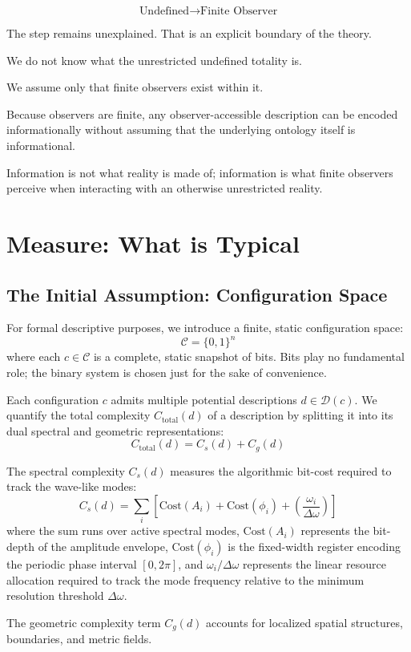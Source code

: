 \[
\text{Undefined} \rightarrow  \text{Finite Observer} 
\]

The step remains unexplained. That is an explicit boundary of the theory.

We do not know what the unrestricted undefined totality is.

We assume only that finite observers exist within it.

Because observers are finite, any observer-accessible description can be encoded informationally without assuming that the underlying ontology itself is informational.

Information is not what reality is made of; information is what finite observers perceive when interacting with an otherwise unrestricted reality.


\section{Measure: What is Typical}


\subsection*{The Initial Assumption: Configuration Space}

For formal descriptive purposes, we introduce a finite, static configuration space:
\[
\mathcal{C} = \{0,1\}^n
\]
where each $c \in \mathcal{C}$ is a complete, static snapshot of bits.
Bits play no fundamental role; the binary system is chosen just for the sake of convenience.

Each configuration $c$ admits multiple potential descriptions $d \in \mathcal{D}(c)$.
We quantify the total complexity $C_{\text{total}}(d)$ of a description by splitting it into its dual spectral and geometric representations:
\[
C_{\text{total}}(d) = C_s(d) + C_g(d)
\]

The spectral complexity $C_s(d)$ measures the algorithmic bit-cost required to track the wave-like modes:
\[
C_s(d) = \sum_i \left[ \text{Cost}(A_i) + \text{Cost}(\phi_i) + \left(\frac{\omega_i}{\Delta \omega}\right) \right]
\]
where the sum runs over active spectral modes, $\text{Cost}(A_i)$ represents the bit-depth of the amplitude envelope, $\text{Cost}(\phi_i)$ is the fixed-width register encoding the periodic phase interval $[0, 2\pi]$, and $\omega_i / \Delta \omega$ represents the linear resource allocation required to track the mode frequency relative to the minimum resolution threshold $\Delta\omega$.

The geometric complexity term $C_g(d)$ accounts for localized spatial structures, boundaries, and metric fields.



